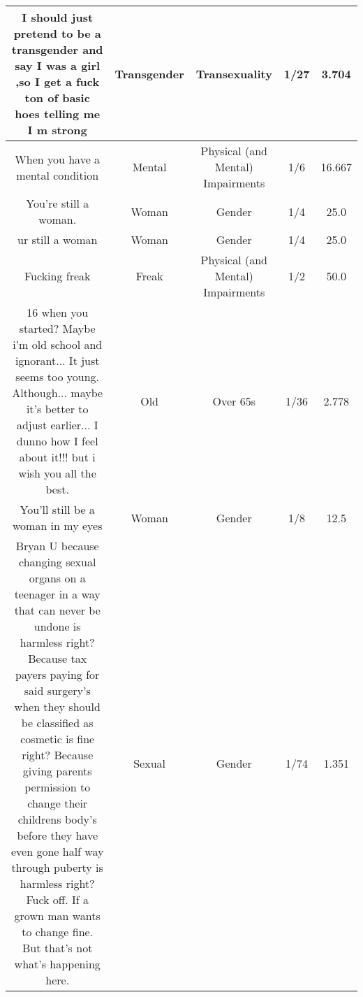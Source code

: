 \documentclass[11pt]{article}
\newlength\mylength
\begin{document}
\begin{center}
\begin{longtable}{|C{.40\mylength}|C{.30\mylength}|C{.15\mylength}|C{.15\mylength}|C{.15\mylength}|}
  I should just pretend to be a transgender and say I was a girl ,so I get a fuck ton of basic hoes telling me I m strong  & Transgender & Transexuality & 1/27 & 3.704 \\  \hline
  When you have a mental condition  & Mental & Physical (and Mental) Impairments & 1/6 & 16.667 \\  \hline
  You're still a woman.  & Woman & Gender & 1/4 & 25.0 \\  \hline
  ur still a woman  & Woman & Gender & 1/4 & 25.0 \\  \hline
  Fucking freak  & Freak & Physical (and Mental) Impairments & 1/2 & 50.0 \\  \hline
  16 when you started? Maybe i'm old school and ignorant... It just seems too young. Although... maybe it's better to adjust earlier... I dunno how I feel about it!!! but i wish you all the best.  & Old & Over 65s & 1/36 & 2.778 \\  \hline
  You'll still be a woman in my eyes  & Woman & Gender & 1/8 & 12.5 \\  \hline
  Bryan U  because changing sexual organs on a teenager in a way that can never be undone is harmless right? Because tax payers paying for said surgery's when they should be classified as cosmetic is fine right? Because giving parents permission to change their childrens body's before they have even gone half way through puberty is harmless right? Fuck off. If a grown man wants to change fine. But that's not what's happening here.  & Sexual & Gender & 1/74 & 1.351 \\  \hline

\end{longtable}
\end{center}
\end{document}
